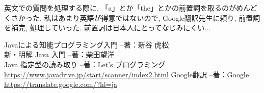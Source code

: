 \documentclass[uplatex,12pt]{jsarticle}
\begin{document}
英文での質問を処理する際に, 「a」とか「the」とかの前置詞を取るのがめんどくさかった. 私はあまり英語が得意ではないので, Google翻訳先生に頼り, 前置詞を補完, 処理していった. 前置詞は日本人にとってなじみにくい...

\begin{thebibliography}{99}
 Javaによる知能プログラミング入門 --著：新谷 虎松 \\
 新・明解 Java 入門 --著：柴田望洋 \\
 Java 指定型の読み取り --著：Let's プログラミング \\
\url{https://www.javadrive.jp/start/scanner/index2.html}
 Google翻訳 --著：Google \\
\url{https://translate.google.com/?hl=ja}
\end{thebibliography}
\end{document}
